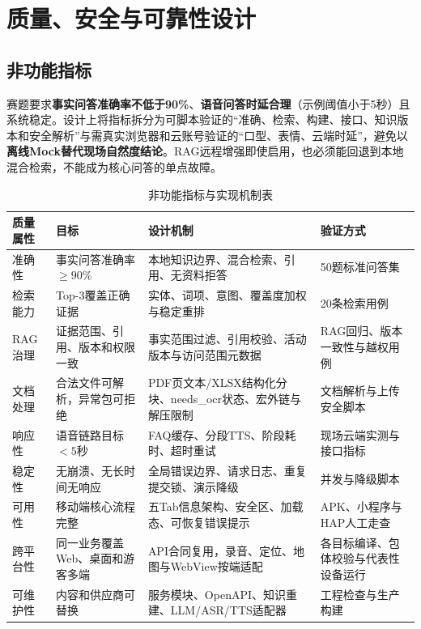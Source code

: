 \chapter{质量、安全与可靠性设计}

\section{非功能指标}

赛题要求\textbf{事实问答准确率不低于90\%}、\textbf{语音问答时延合理}（示例阈值小于5秒）且系统稳定。设计上将指标拆分为可脚本验证的“准确、检索、构建、接口、知识版本和安全解析”与需真实浏览器和云账号验证的“口型、表情、云端时延”，避免以\textbf{离线Mock替代现场自然度结论}。RAG远程增强即使启用，也必须能回退到本地混合检索，不能成为核心问答的单点故障。

\begin{table}[H]
  \centering
  \caption{非功能指标与实现机制表}\label{tab:nfr}
  \begin{tabularx}{\textwidth}{p{}p{}X p{}}
    \toprule
    质量属性 & 目标 & 设计机制 & 验证方式 \\
    \midrule
    准确性 & 事实问答准确率$\geq90\%$ & 本地知识边界、混合检索、引用、无资料拒答 & 50题标准问答集 \\
    检索能力 & Top-3覆盖正确证据 & 实体、词项、意图、覆盖度加权与稳定重排 & 20条检索用例 \\
    RAG治理 & 证据范围、引用、版本和权限一致 & 事实范围过滤、引用校验、活动版本与访问范围元数据 & RAG回归、版本一致性与越权用例 \\
    文档处理 & 合法文件可解析，异常包可拒绝 & PDF页文本/XLSX结构化分块、needs\_ocr状态、宏外链与解压限制 & 文档解析与上传安全脚本 \\
    响应性 & 语音链路目标$<5$秒 & FAQ缓存、分段TTS、阶段耗时、超时重试 & 现场云端实测与接口指标 \\
    稳定性 & 无崩溃、无长时间无响应 & 全局错误边界、请求日志、重复提交锁、演示降级 & 并发与降级脚本 \\
    可用性 & 移动端核心流程完整 & 五Tab信息架构、安全区、加载态、可恢复错误提示 & APK、小程序与HAP人工走查 \\
    跨平台性 & 同一业务覆盖Web、桌面和游客多端 & API合同复用，录音、定位、地图与WebView按端适配 & 各目标编译、包体校验与代表性设备运行 \\
    可维护性 & 内容和供应商可替换 & 服务模块、OpenAPI、知识重建、LLM/ASR/TTS适配器 & 工程检查与生产构建 \\
    \bottomrule
  \end{tabularx}
\end{table}

